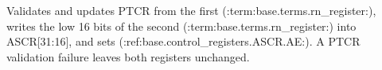 Validates and updates PTCR from the first (:term:base.terms.rn_register:), writes the low 16 bits of the second (:term:base.terms.rn_register:) into ASCR[31:16], and sets (:ref:base.control_registers.ASCR.AE:). A PTCR validation failure leaves both registers unchanged.
